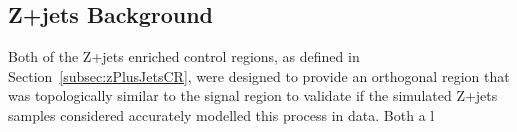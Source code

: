 

\subsection{Z+jets Background}\label{subsec:zPlusJetsEstimation}
Both of the Z+jets enriched control regions, as defined in Section~\ref{subsec:zPlusJetsCR}, were designed to provide an orthogonal region that was topologically similar to the signal region to validate if the simulated Z+jets samples considered accurately modelled this process in data.
Both a l

